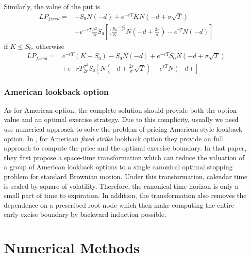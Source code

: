 \documentclass[11pt]{book}
\begin{document}
Similarly, the value of the put is 
\begin{equation}
\begin{split}
LP_{fixed} =& -S_0 N(-d) + e^{-rT} KN(-d + \sigma \sqrt{T})  \\
&+ e^{-rT} \frac{\sigma^2}{2r} S_0 [ (\frac{S_0}{K}^{-\frac{2r}{\sigma^2}}N(-d+\frac{2r}{\sigma}) - e^{rT}N(-d)]
\end{split}
\end{equation}
if $K\leq S_0$, otherwise
\begin{equation}
\begin{split}
LP_{fixed} = & e^{-rT} (K-S_0) - S_0 N(-d) + e^{-rT}S_0 N (-d + \sigma \sqrt{T}) \\
&+ e{-rT} \frac{\sigma^2}{2r} S_0 [ N(-d + \frac{2r}{\sigma} \sqrt{T}) -e^{rT}N(-d)]
\end{split}
\end{equation}
 
\subsection{American lookback option}

As for American option, the complete solution should provide both the option value and an optimal exercise strategy. Due to this complicity, usually we need use numerical approach to solve the problem of pricing American style lookback option. In \cite{Lim2004}, for American \emph {fixed strike} lookback option they provide an full approach to compute the price and the optimal exercise boundary. In that paper, they first propose a space-time transformation which can reduce the valuation of a group of American lookback options to a single canonical optimal stopping problem for standard Brownian motion. Under this transformation, calendar time is scaled by square of volatility. Therefore, the canonical time horizon is only a small part of time to expiration. In addition, the transformation also removes the dependence on a prescribed root node which then make computing the entire early excise boundary by backward induction possible.


\chapter{Numerical Methods}
\end{document}
